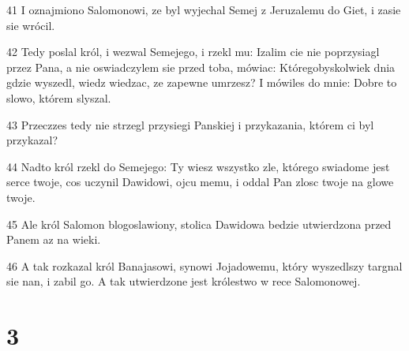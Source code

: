 \par 41 I oznajmiono Salomonowi, ze byl wyjechal Semej z Jeruzalemu do Giet, i zasie sie wrócil.
\par 42 Tedy poslal król, i wezwal Semejego, i rzekl mu: Izalim cie nie poprzysiagl przez Pana, a nie oswiadczylem sie przed toba, mówiac: Któregobyskolwiek dnia gdzie wyszedl, wiedz wiedzac, ze zapewne umrzesz? I mówiles do mnie: Dobre to slowo, którem slyszal.
\par 43 Przeczzes tedy nie strzegl przysiegi Panskiej i przykazania, którem ci byl przykazal?
\par 44 Nadto król rzekl do Semejego: Ty wiesz wszystko zle, którego swiadome jest serce twoje, cos uczynil Dawidowi, ojcu memu, i oddal Pan zlosc twoje na glowe twoje.
\par 45 Ale król Salomon blogoslawiony, stolica Dawidowa bedzie utwierdzona przed Panem az na wieki.
\par 46 A tak rozkazal król Banajasowi, synowi Jojadowemu, który wyszedlszy targnal sie nan, i zabil go. A tak utwierdzone jest królestwo w rece Salomonowej.

\chapter{3}

